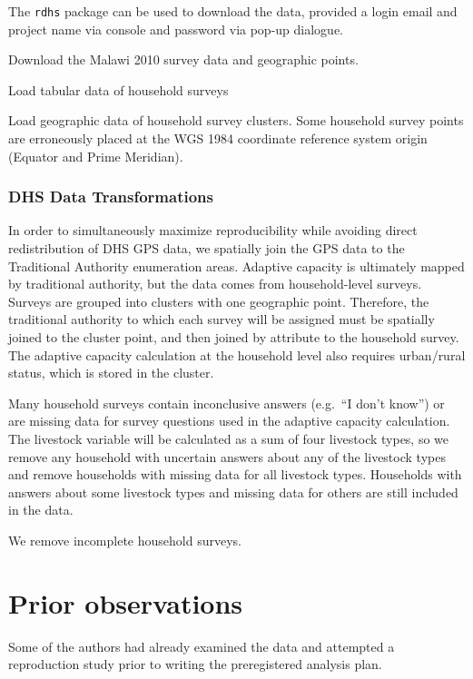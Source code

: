 \documentclass[
]{article}
\begin{document}
The \texttt{rdhs} package can be used to download the data, provided a
login email and project name via console and password via pop-up
dialogue.

Download the Malawi 2010 survey data and geographic points.

Load tabular data of household surveys

Load geographic data of household survey clusters. Some household survey
points are erroneously placed at the WGS 1984 coordinate reference
system origin (Equator and Prime Meridian).

\hypertarget{dhs-data-transformations}{%
\subsubsection{DHS Data
Transformations}\label{dhs-data-transformations}}

In order to simultaneously maximize reproducibility while avoiding
direct redistribution of DHS GPS data, we spatially join the GPS data to
the Traditional Authority enumeration areas. Adaptive capacity is
ultimately mapped by traditional authority, but the data comes from
household-level surveys. Surveys are grouped into clusters with one
geographic point. Therefore, the traditional authority to which each
survey will be assigned must be spatially joined to the cluster point,
and then joined by attribute to the household survey. The adaptive
capacity calculation at the household level also requires urban/rural
status, which is stored in the cluster.

Many household surveys contain inconclusive answers (e.g.~``I don't
know'') or are missing data for survey questions used in the adaptive
capacity calculation. The livestock variable will be calculated as a sum
of four livestock types, so we remove any household with uncertain
answers about any of the livestock types and remove households with
missing data for all livestock types. Households with answers about some
livestock types and missing data for others are still included in the
data.

We remove incomplete household surveys.

\hypertarget{prior-observations}{%
\section{Prior observations}\label{prior-observations}}

Some of the authors had already examined the data and attempted a
reproduction study prior to writing the preregistered analysis plan.
\end{document}
